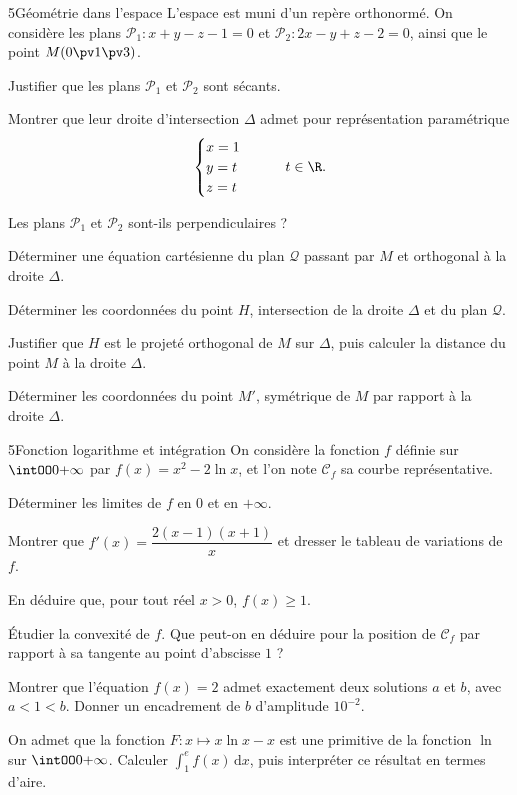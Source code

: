 \begin{exoBac}{5}{Géométrie dans l'espace}
L'espace est muni d'un repère orthonormé. On considère les plans $\mathcal{P}_1:x+y-z-1=0$ et $\mathcal{P}_2:2x-y+z-2=0$, ainsi que le
point $M(0\pv1\pv3)$.
\begin{questions}
  \item Justifier que les plans $\mathcal{P}_1$ et $\mathcal{P}_2$ sont sécants.
  \item Montrer que leur droite d'intersection $\Delta$ admet pour représentation paramétrique
    \[\begin{cases}x=1\\y=t\\z=t\end{cases}\qquad t\in\R.\]
  \item Les plans $\mathcal{P}_1$ et $\mathcal{P}_2$ sont-ils perpendiculaires ?
  \item Déterminer une équation cartésienne du plan $\mathcal{Q}$ passant par $M$ et orthogonal à la droite $\Delta$.
  \item Déterminer les coordonnées du point $H$, intersection de la droite $\Delta$ et du plan $\mathcal{Q}$.
  \item Justifier que $H$ est le projeté orthogonal de $M$ sur $\Delta$, puis calculer la distance du point $M$ à la droite $\Delta$.
  \item Déterminer les coordonnées du point $M'$, symétrique de $M$ par rapport à la droite $\Delta$.
\end{questions}
\end{exoBac}

\begin{exoBac}{5}{Fonction logarithme et intégration}
On considère la fonction $f$ définie sur $\intOO0{+\infty}$ par $f(x)=x^{2}-2\ln x$, et l'on note $\mathcal{C}_f$ sa courbe représentative.
\begin{questions}
  \item Déterminer les limites de $f$ en $0$ et en $+\infty$.
  \item Montrer que $f'(x)=\dfrac{2(x-1)(x+1)}{x}$ et dresser le tableau de variations de $f$.
  \item En déduire que, pour tout réel $x>0$, $f(x)\geq1$.
  \item Étudier la convexité de $f$. Que peut-on en déduire pour la position de $\mathcal{C}_f$ par rapport à sa tangente au point
    d'abscisse $1$ ?
\end{questions}
\begin{questions}[resume]
  \item Montrer que l'équation $f(x)=2$ admet exactement deux solutions $a$ et $b$, avec $a<1<b$. Donner un encadrement de $b$
    d'amplitude $10^{-2}$.
  \item On admet que la fonction $F:x\mapsto x\ln x-x$ est une primitive de la fonction $\ln$ sur $\intOO0{+\infty}$. Calculer
    $\int_1^{e}f(x)\,\mathrm{d}x$, puis interpréter ce résultat en termes d'aire.
\end{questions}
\end{exoBac}
